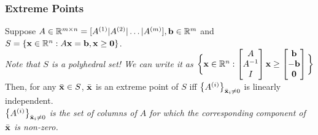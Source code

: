 \subsubsection{Extreme Points}

\begin{theo}{}{}
Suppose $A \in \mathbb{R}^{m \times n} = [A^{(1)} | A^{(2)} | \ldots | A^{(m)} ],
\mathbf{b} \in \mathbb{R}^m$ and 
$S = \{ \mathbf{x} \in \mathbb{R}^n : A\mathbf{x} = \mathbf{b}, \mathbf{x} \geq \mathbf{0}\}$.
\bigskip\\
\textit{Note that $S$ is a polyhedral set! We can write it as 
$\bigg\{ \mathbf{x} \in \mathbb{R}^n : \begin{bmatrix} A \\ A^{-1} \\ I \\ \end{bmatrix} \mathbf{x} 
\geq \begin{bmatrix} \mathbf{b} \\ -\mathbf{b} \\ \mathbf{0} \\ \end{bmatrix} \bigg\}$}
\bigskip\\
Then, for any $\bar{\mathbf{x}} \in S$, $\bar{\mathbf{x}}$ is an extreme point of $S$ iff $\big\{ A^{(i)}
\big\}_{\bar{\mathbf{x}}_i \neq 0}$ is linearly independent. 
\medskip\\
\textit{$\big\{ A^{(i)}
\big\}_{\bar{\mathbf{x}}_i \neq 0}$ is
the set of columns of $A$ for which the corresponding
component of $\bar{\mathbf{x}}$ is non-zero.}
\end{theo}

